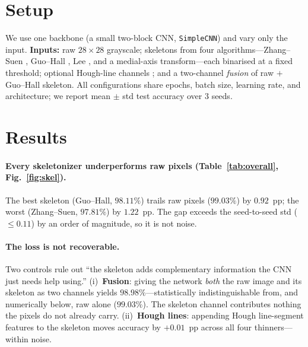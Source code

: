 \documentclass{article}
\begin{document}
\section{Setup}
We use one backbone (a small two-block CNN, \texttt{SimpleCNN}) and vary only the input.
\textbf{Inputs:} raw $28\times28$ grayscale; skeletons from four algorithms---Zhang--Suen
\cite{ZhangSuen1984}, Guo--Hall \cite{GuoHall1989}, Lee \cite{Lee1994}, and a medial-axis
transform---each binarised at a fixed threshold; optional Hough-line channels
\cite{DudaHart1972}; and a two-channel \emph{fusion} of raw $+$ Guo--Hall skeleton. All
configurations share epochs, batch size, learning rate, and architecture; we report mean
$\pm$ std test accuracy over $3$ seeds.

\section{Results}
\paragraph{Every skeletonizer underperforms raw pixels (Table~\ref{tab:overall},
Fig.~\ref{fig:skel}).}
The best skeleton (Guo--Hall, $98.11\%$) trails raw pixels ($99.03\%$) by $0.92$~pp; the worst
(Zhang--Suen, $97.81\%$) by $1.22$~pp. The gap exceeds the seed-to-seed std ($\leq 0.11$) by an
order of magnitude, so it is not noise.

\paragraph{The loss is not recoverable.}
Two controls rule out ``the skeleton adds complementary information the CNN just needs help
using.'' (i)~\textbf{Fusion}: giving the network \emph{both} the raw image and its skeleton as
two channels yields $98.98\%$---statistically indistinguishable from, and numerically below, raw
alone ($99.03\%$). The skeleton channel contributes nothing the pixels do not already carry.
(ii)~\textbf{Hough lines}: appending Hough line-segment features to the skeleton moves accuracy by
$+0.01$~pp across all four thinners---within noise.
\end{document}
